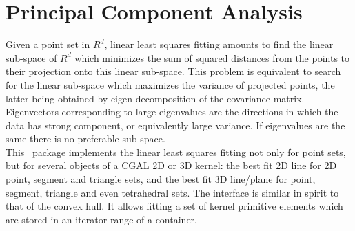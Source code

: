 
\chapter{Principal Component Analysis}
\label{chap:PCA}

Given a point set in $R^d$, linear least squares fitting amounts to
find the linear sub-space of $R^d$ which minimizes the sum of squared
distances from the points to their projection onto this linear
sub-space. This problem is equivalent to search for the linear
sub-space which maximizes the variance of projected points, the latter
being obtained by eigen decomposition of the covariance
matrix. Eigenvectors corresponding to large eigenvalues are the
directions in which the data has strong component, or equivalently
large variance. If eigenvalues are the same there is no preferable
sub-space.\\

This \cgal\ package implements the linear least squares fitting not
only for point sets, but for several objects of a CGAL 2D or 3D
kernel: the best fit 2D line for 2D point, segment and triangle sets,
and the best fit 3D line/plane for point, segment, triangle and even
tetrahedral sets. The interface is similar in spirit to that of the
convex hull. It allows fitting a set of kernel primitive elements
which are stored in an iterator range of a container.

\\

\\
\\
\\
\\
\\
\clearpage

